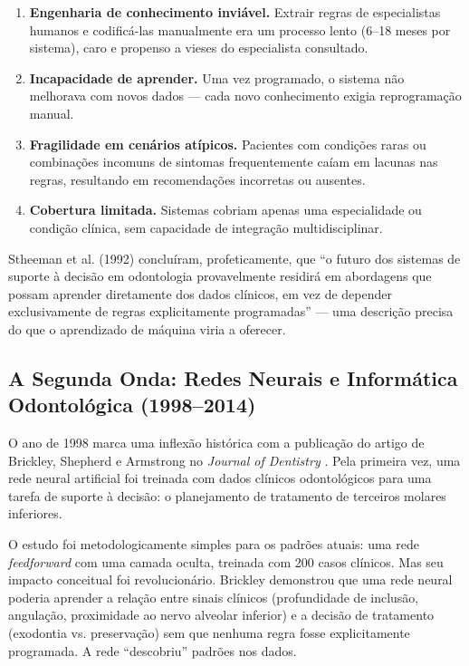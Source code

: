 \begin{enumerate}
    \item \textbf{Engenharia de conhecimento inviável.} Extrair regras de especialistas humanos e codificá-las manualmente era um processo lento (6--18 meses por sistema), caro e propenso a vieses do especialista consultado.
    \item \textbf{Incapacidade de aprender.} Uma vez programado, o sistema não melhorava com novos dados — cada novo conhecimento exigia reprogramação manual.
    \item \textbf{Fragilidade em cenários atípicos.} Pacientes com condições raras ou combinações incomuns de sintomas frequentemente caíam em lacunas nas regras, resultando em recomendações incorretas ou ausentes.
    \item \textbf{Cobertura limitada.} Sistemas cobriam apenas uma especialidade ou condição clínica, sem capacidade de integração multidisciplinar.
\end{enumerate}

Stheeman et al. (1992) concluíram, profeticamente, que ``o futuro dos sistemas de suporte à decisão em odontologia provavelmente residirá em abordagens que possam aprender diretamente dos dados clínicos, em vez de depender exclusivamente de regras explicitamente programadas'' — uma descrição precisa do que o aprendizado de máquina viria a oferecer.

\subsection{A Segunda Onda: Redes Neurais e Informática Odontológica (1998--2014)}

O ano de 1998 marca uma inflexão histórica com a publicação do artigo de Brickley, Shepherd e Armstrong no \textit{Journal of Dentistry} \cite{ODT-002}. Pela primeira vez, uma rede neural artificial foi treinada com dados clínicos odontológicos para uma tarefa de suporte à decisão: o planejamento de tratamento de terceiros molares inferiores.


O estudo foi metodologicamente simples para os padrões atuais: uma rede \textit{feedforward} com uma camada oculta, treinada com 200 casos clínicos. Mas seu impacto conceitual foi revolucionário. Brickley demonstrou que uma rede neural poderia aprender a relação entre sinais clínicos (profundidade de inclusão, angulação, proximidade ao nervo alveolar inferior) e a decisão de tratamento (exodontia vs. preservação) sem que nenhuma regra fosse explicitamente programada. A rede ``descobriu'' padrões nos dados.

